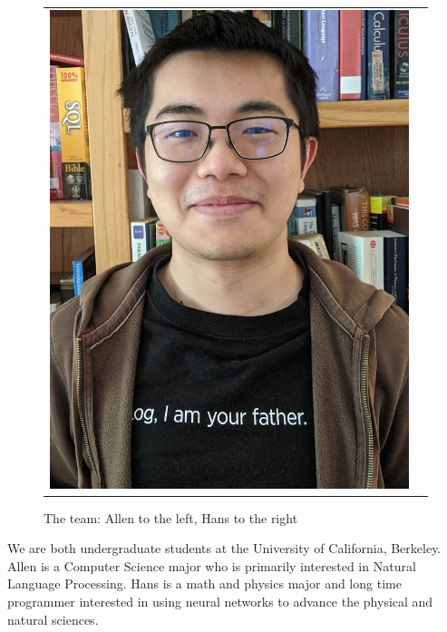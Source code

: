 \documentclass[conference, 12pt, onecolumn]{IEEEtran}
\begin{document}
\begin{figure}[h!]
\begin{tabular}{ll}
\includegraphics[scale=.25]{mao.jpg} %
\end{tabular}
\captionsetup{labelformat=empty}
\caption{The team: Allen to the left, Hans to the right}
\end{figure}
We are both undergraduate students at the University of California, Berkeley. Allen is a Computer Science major who is primarily interested in Natural Language Processing. Hans is a math and physics major and long time programmer interested in using neural networks to advance the physical and natural sciences. %
\end{document}
